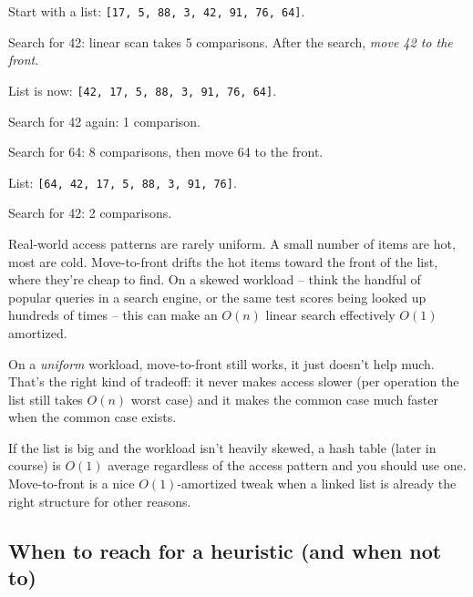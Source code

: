\documentclass[11pt]{article}
\begin{document}
\begin{examplebox}
Start with a list: \texttt{[17, 5, 88, 3, 42, 91, 76, 64]}.

Search for 42: linear scan takes 5 comparisons. After the search,
\emph{move 42 to the front}.

List is now: \texttt{[42, 17, 5, 88, 3, 91, 76, 64]}.

Search for 42 again: 1 comparison.

Search for 64: 8 comparisons, then move 64 to the front.

List: \texttt{[64, 42, 17, 5, 88, 3, 91, 76]}.

Search for 42: 2 comparisons.
\end{examplebox}

\begin{ideabox}
Real-world access patterns are rarely uniform. A small number of
items are hot, most are cold. Move-to-front drifts the hot items
toward the front of the list, where they're cheap to find. On a
skewed workload -- think the handful of popular queries in a search
engine, or the same test scores being looked up hundreds of times --
this can make an $O(n)$ linear search effectively $O(1)$ amortized.

On a \emph{uniform} workload, move-to-front still works, it just
doesn't help much. That's the right kind of tradeoff: it never
makes access slower (per operation the list still takes $O(n)$
worst case) and it makes the common case much faster when the
common case exists.
\end{ideabox}

\begin{warnbox}
If the list is big and the workload isn't heavily skewed, a hash
table (\textsection later in course) is $O(1)$ average regardless
of the access pattern and you should use one. Move-to-front is a
nice $O(1)$-amortized tweak when a linked list is already the right
structure for other reasons.
\end{warnbox}

\subsection{When to reach for a heuristic (and when not to)}
\end{document}
